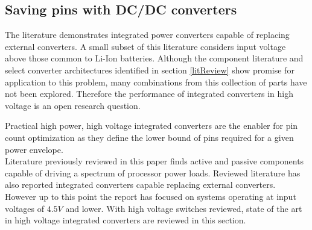 \documentclass[letterpaper,twocolumn,10pt]{article}
\begin{document}

\subsection{Saving pins with DC/DC converters}

The literature demonstrates integrated power converters capable of replacing external converters. A small subset of this literature considers input voltage above those common to Li-Ion batteries. 
\indent Although the component literature and select converter architectures identified in section \ref{litReview} show promise for application to this problem, many combinations from this collection of parts have not been explored. Therefore the performance of integrated converters in high voltage is an open research question.

Practical high power, high voltage integrated converters are the enabler for pin count optimization as they define the lower bound of pins required for a given power envelope.\\
Literature previously reviewed in this paper finds active and passive components capable of driving a spectrum of processor power loads. Reviewed literature has also reported integrated converters capable replacing external converters. However up to this point the report has focused on systems operating at input voltages of $4.5V$ and lower. With high voltage switches reviewed, state of the art in high voltage integrated converters are reviewed in this section.\\
\end{document}
